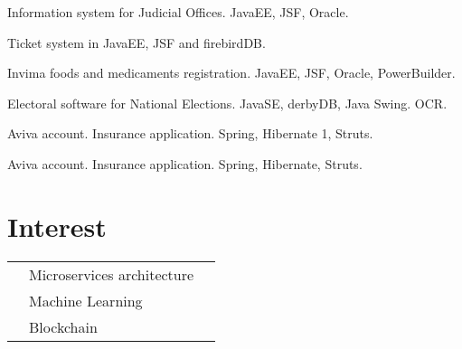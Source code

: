 \documentclass[]{deedy-resume-openfont}
\begin{document}
\begin{minipage}[t]{0.66\textwidth}
\begin{tightemize}
\item Information system for Judicial Offices. JavaEE, JSF, Oracle.   
\end{tightemize}
\sectionsep

\begin{tightemize}
\item Ticket system  in JavaEE, JSF and firebirdDB.  
\end{tightemize}
\sectionsep

\begin{tightemize}
\item Invima foods and medicaments registration. JavaEE, JSF, Oracle, PowerBuilder. 
\item Electoral software for National Elections. JavaSE, derbyDB, Java Swing. OCR. 
\end{tightemize}
\sectionsep

\begin{tightemize}
\item Aviva account. Insurance application. Spring, Hibernate 1, Struts. 
\end{tightemize}
\sectionsep

\begin{tightemize}
\item Aviva account. Insurance application. Spring, Hibernate, Struts. 
\end{tightemize}
\sectionsep


\section{Interest} 
\begin{tabular}{rll}
& Microservices architecture\\
& Machine Learning \\
& Blockchain \\
\end{tabular}
\sectionsep

\end{minipage} 
\end{document}
